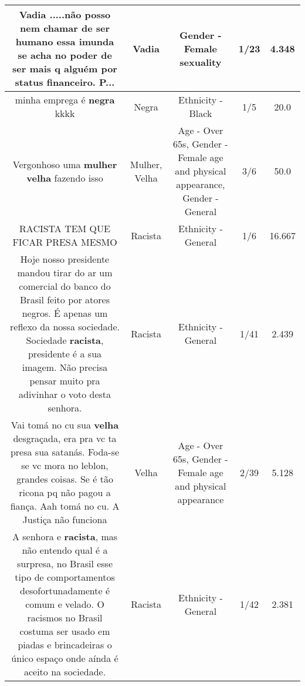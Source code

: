 \documentclass[11pt]{article}
\newlength\mylength
\begin{document}
\begin{center}
\begin{longtable}{|C{.65\mylength}|C{.30\mylength}|C{.12\mylength}|C{.12\mylength}|C{.12\mylength}|}
  \small Vadia .....não posso nem chamar de ser humano essa imunda se acha no poder de ser mais q alguém por status financeiro. P...\normalsize   & Vadia & Gender - Female sexuality & 1/23 & 4.348 \\  \hline
  \small minha emprega é \textbf{negra} kkkk\normalsize   & Negra & Ethnicity - Black & 1/5 & 20.0 \\  \hline
  \small Vergonhoso uma \textbf{mulher} \textbf{v\textbf{elha}} fazendo isso\normalsize   & Mulher, Velha & Age - Over 65s, Gender - Female age and physical appearance, Gender - General & 3/6 & 50.0 \\  \hline
  \small RACISTA TEM QUE FICAR PRESA MESMO\normalsize   & Racista & Ethnicity - General & 1/6 & 16.667 \\  \hline
  \small Hoje nosso presidente mandou tirar do ar um comercial do banco do Brasil feito por atores negros. É apenas um reflexo da nossa sociedade. Sociedade \textbf{racista}, presidente é a sua imagem.  Não precisa pensar muito pra adivinhar o voto desta senhora.\normalsize   & Racista & Ethnicity - General & 1/41 & 2.439 \\  \hline
  \small Vai tomá no cu sua \textbf{v\textbf{elha}} desgraçada, era pra vc ta presa sua satanás. Foda-se se vc mora no leblon, grandes coisas. Se é tão ricona pq não pagou a fiança. Aah tomá no cu. A Justiça não funciona\normalsize   & Velha & Age - Over 65s, Gender - Female age and physical appearance & 2/39 & 5.128 \\  \hline
  \small A senhora e \textbf{racista},  mas não entendo qual é a surpresa, no Brasil esse tipo de comportamentos desofortunadamente é comum e velado. O racismos  no Brasil costuma ser usado em piadas e brincadeiras  o único espaço onde aínda é aceito na sociedade.\normalsize   & Racista & Ethnicity - General & 1/42 & 2.381 \\  \hline

\end{longtable}
\end{center}
\end{document}
